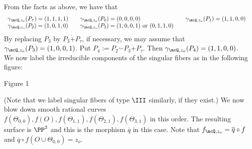 From the facts as above, we have that 
\[
\begin{array}{cclcc}
\gamma_{\mcQ, z_o} (P_{\tau}) =   (1, 1, 1,1) & &
\gamma_{\mcQ, z_o} (P_0)  =  (0, 0, 0,0) &&
\gamma_{\mcQ, z_o} (P_1)  =  (1, 1, 0,0)  \\
\gamma_{\mcQ, z_o} (P_2)  =  (1, 0, 1,0) & &
\gamma_{\mcQ, z_o} (P_3)  =  (1, 0, 0,1)  \,\, \mbox{\rm or} \,\,(0, 1, 1, 0) & & 
\end{array}
\]
By replacing $P_3$ by $P_3 \dot{+} P_\tau$, if necessary, we may assume that
 $\gamma_{\mcQ, z_o} (P_3)  =  (1, 0, 0,1)$.   Put $P_4:= P_2 \dot {-} P_3\dot{+}P_{\tau}$. Then
$\gamma_{\mcQ, z_o}(P_4) = (1, 1, 0, 0)$. We now label the irreducible components of the singular fibers as in the following figure:
\begin{center}


Figure 1
\end{center}
% 
(Note that we label singular fibers of type $\III$ similarly, if they exist.) 
We now blow down  smooth rational curves $f(\Theta_{0, 0}), f(O), f(\Theta_{1, 1}),
f(\Theta_{2, 1}),  f(\Theta_{3, 1})$  in this order. The resulting surface is $\PP^2$ and  this is the morphism
$\overline q$ in this case.
Note that $f_{\mcQ, z_o} = \overline{q}\circ f$ and $\overline {q}\circ f(O\cup \Theta_{0,0}) = z_o$. 



